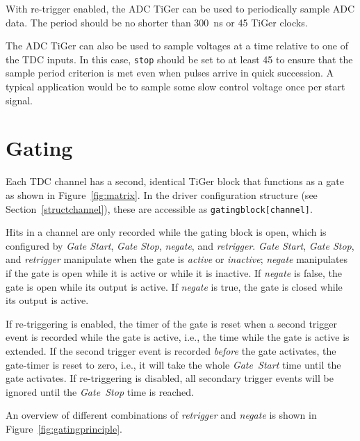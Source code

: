 {    With re-trigger enabled, the ADC TiGer can be used to periodically
    sample ADC data.  The period should be no shorter than
    \SI{300}{\nano\second} or 45 TiGer clocks.

    The ADC TiGer can also be used to sample voltages at a time relative
    to one of the TDC inputs. In this case, \texttt{stop} should be set to
    at least 45 to ensure that the sample period criterion is met even
    when pulses arrive in quick succession. A typical application would be
    to sample some slow control voltage once per start signal.

    \newpage
    \label{cp:gating}
    \section{Gating}
    Each TDC channel has a second, identical TiGer block that functions as a
    gate as shown in Figure~\ref{fig:matrix}. In the driver configuration
    structure (see Section~\ref{structchannel}), these are accessible as
    \mbox{\texttt{gating\tu block[channel]}}.  

    Hits in a channel are only recorded while the gating block is open, which
    is configured by \emph{Gate Start}, \emph{Gate Stop}, \emph{negate}, and
    \emph{retrigger}.
    \emph{Gate Start}, \emph{Gate Stop}, and \emph{retrigger} manipulate when
    the gate is \emph{active} or \emph{inactive}; \emph{negate} manipulates 
    if the gate is open while it is active or while it is inactive.
    If \emph{negate} is false, the gate is open while its output is active.
    If \emph{negate} is true, the gate is closed while its output is active.
    
    If re-triggering is enabled, the timer of the gate is reset when a second
    trigger event is recorded while the gate is active, i.e., the time while
    the gate is active is extended. If the second trigger event is recorded
    \textit{before} the gate activates, the gate-timer is reset to zero, i.e.,
    it will take the whole \textit{Gate~Start} time until the gate activates.
    If re-triggering is disabled, all secondary trigger events will be ignored
    until the \textit{Gate~Stop} time is reached.

    An overview of different combinations of \emph{retrigger} and \emph{negate}
    is shown in Figure~\ref{fig:gatingprinciple}.

}
